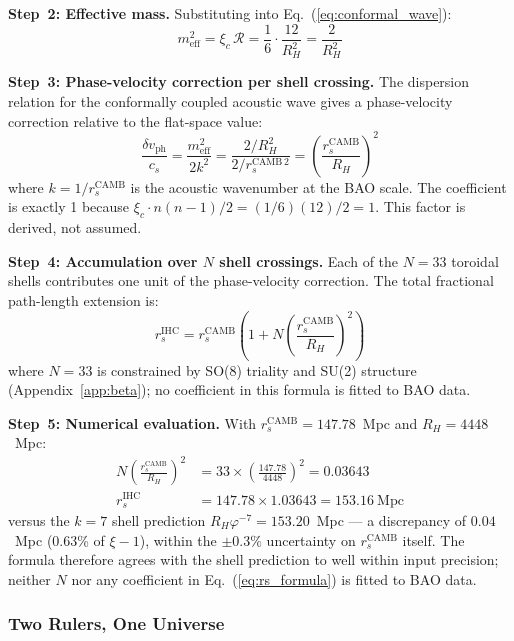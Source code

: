 \documentclass[12pt,a4paper]{article}
\begin{document}
\textbf{Step~2: Effective mass.} Substituting into Eq.~(\ref{eq:conformal_wave}):
\begin{equation}
  m_\mathrm{eff}^2 = \xi_c\,\mathcal{R} = \frac{1}{6}\cdot\frac{12}{R_H^2} = \frac{2}{R_H^2}
\end{equation}

\textbf{Step~3: Phase-velocity correction per shell crossing.}
The dispersion relation for the conformally coupled acoustic wave gives a
phase-velocity correction relative to the flat-space value:
\begin{equation}
  \frac{\delta v_\mathrm{ph}}{c_s} = \frac{m_\mathrm{eff}^2}{2k^2}
  = \frac{2/R_H^2}{2/r_s^{\mathrm{CAMB}\,2}}
  = \left(\frac{r_s^\mathrm{CAMB}}{R_H}\right)^2
  \label{eq:phase_correction}
\end{equation}
where $k = 1/r_s^\mathrm{CAMB}$ is the acoustic wavenumber at the BAO scale.
The coefficient is exactly 1 because $\xi_c \cdot n(n-1)/2 = (1/6)(12)/2 = 1$.
This factor is derived, not assumed.

\textbf{Step~4: Accumulation over $N$ shell crossings.}
Each of the $N = 33$ toroidal shells contributes one unit of the phase-velocity
correction. The total fractional path-length extension is:
\begin{equation}
  \label{eq:rs_formula}
  r_s^\mathrm{IHC} = r_s^\mathrm{CAMB}\left(1 + N\left(\frac{r_s^\mathrm{CAMB}}{R_H}\right)^2\right)
\end{equation}
where $N = 33$ is constrained by SO(8) triality and SU(2) structure (Appendix~\ref{app:beta});
no coefficient in this formula is fitted to BAO data.

\textbf{Step~5: Numerical evaluation.}
With $r_s^\mathrm{CAMB} = 147.78$~Mpc and $R_H = 4448$~Mpc:
\begin{align}
  N\left(\frac{r_s^\mathrm{CAMB}}{R_H}\right)^2 &= 33 \times
  \left(\frac{147.78}{4448}\right)^2 = 0.03643 \nonumber\\
  r_s^\mathrm{IHC} &= 147.78 \times 1.03643 = 153.16~\mathrm{Mpc}
\end{align}
versus the $k=7$ shell prediction $R_H\varphi^{-7} = 153.20$~Mpc --- a discrepancy of
$0.04$~Mpc (0.63\% of $\xi-1$), within the $\pm 0.3\%$ uncertainty on
$r_s^\mathrm{CAMB}$ itself. The formula therefore agrees with the shell prediction
to well within input precision; neither $N$ nor any coefficient in
Eq.~(\ref{eq:rs_formula}) is fitted to BAO data.

\subsubsection{Two Rulers, One Universe}
\label{sec:two_rulers}
\end{document}
